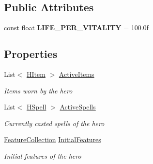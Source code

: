 \subsection*{Public Attributes}
\begin{DoxyCompactItemize}
\item 
\hypertarget{class_hel_project_1_1_features_1_1_feature_manager_a82ddccda10f8361c1ba5b386037a427e}{}const float {\bfseries L\+I\+F\+E\+\_\+\+P\+E\+R\+\_\+\+V\+I\+T\+A\+L\+I\+T\+Y} = 100.\+0f\label{class_hel_project_1_1_features_1_1_feature_manager_a82ddccda10f8361c1ba5b386037a427e}

\end{DoxyCompactItemize}
\subsection*{Properties}
\begin{DoxyCompactItemize}
\item 
List$<$ \hyperlink{class_hel_project_1_1_game_world_1_1_h_item}{H\+Item} $>$ \hyperlink{class_hel_project_1_1_features_1_1_feature_manager_a12a4a1dfd4a78d9cd47ae79b6bc6b7da}{Active\+Items}
\begin{DoxyCompactList}\small\item\em Items worn by the hero \end{DoxyCompactList}\item 
List$<$ \hyperlink{class_hel_project_1_1_game_world_1_1_spells_1_1_h_spell}{H\+Spell} $>$ \hyperlink{class_hel_project_1_1_features_1_1_feature_manager_afc065fffad775f30c796536009f67e24}{Active\+Spells}
\begin{DoxyCompactList}\small\item\em Currently casted spells of the hero \end{DoxyCompactList}\item 
\hyperlink{class_hel_project_1_1_features_1_1_feature_collection}{Feature\+Collection} \hyperlink{class_hel_project_1_1_features_1_1_feature_manager_a11ca4dbbba29012ad2633728518e5dd7}{Initial\+Features}
\begin{DoxyCompactList}\small\item\em Initial features of the hero \end{DoxyCompactList}\end{DoxyCompactItemize}


